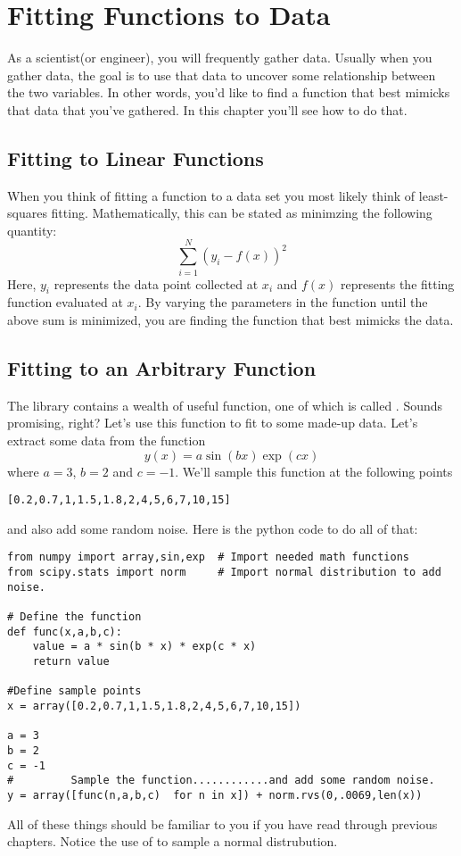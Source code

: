 \chapter{Fitting Functions to Data}
\label{chap:Fitting}

As a scientist(or engineer), you will frequently gather data.  Usually
when you gather data, the goal is to use that data to uncover some
relationship between the two variables.  In other words, you'd like to
find a function that best mimicks that data that you've gathered.  In
this chapter you'll see how to do that.

\section{Fitting to Linear Functions}
When you think of fitting a function to a data set you most likely
think of least-squares fitting.  Mathematically, this can be stated
as minimzing the following quantity:
\begin{equation}
\sum_{i=1}^N (y_i - f(x))^2
\end{equation}
Here, $y_i$ represents the data point collected at $x_i$ and $f(x)$ represents
the fitting function evaluated at $x_i$.  By varying the parameters in
the function until the above sum is minimized, you are finding the
function that best mimicks the data.

\section{Fitting to an Arbitrary Function}
The  library contains a wealth of useful function, one
of which is called .  Sounds promising, right?
Let's use this function to fit to some made-up data.  Let's extract
some data from the function
\begin{equation}
y(x)  = a \sin(b x) \exp(c x)
\end{equation}
where $a = 3$, $b=2$ and $c= -1$.  We'll sample this function at the
following points
\begin{Verbatim}
[0.2,0.7,1,1.5,1.8,2,4,5,6,7,10,15]
\end{Verbatim}
and also add some random noise.  Here is the python code to do all of
that:
\begin{Verbatim}
from numpy import array,sin,exp  # Import needed math functions
from scipy.stats import norm     # Import normal distribution to add noise.

# Define the function
def func(x,a,b,c):
    value = a * sin(b * x) * exp(c * x)
    return value

#Define sample points
x = array([0.2,0.7,1,1.5,1.8,2,4,5,6,7,10,15])

a = 3
b = 2
c = -1
#         Sample the function............and add some random noise.
y = array([func(n,a,b,c)  for n in x]) + norm.rvs(0,.0069,len(x))
\end{Verbatim}
All of these things should be familiar to you if you have read through
previous chapters.  Notice the use of  to sample a
normal distrubution.

